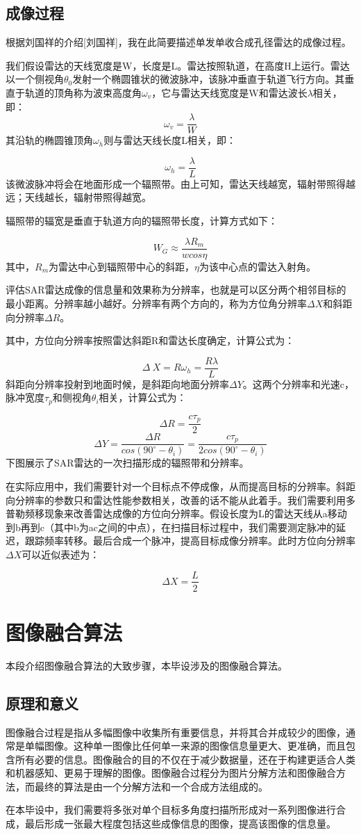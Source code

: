 \documentclass{xduugthesis}
\begin{document}
\subsection{成像过程}
根据刘国祥的介绍[刘国祥]，我在此简要描述单发单收合成孔径雷达的成像过程。\par
我们假设雷达的天线宽度是W，长度是L。雷达按照轨道，在高度H上运行。雷达以一个侧视角$\theta_0$发射一个椭圆锥状的微波脉冲，该脉冲垂直于轨道飞行方向。其垂直于轨道的顶角称为波束高度角$\omega_v$，它与雷达天线宽度是W和雷达波长$\lambda$相关，即：
$$\omega_v=\frac{\lambda}{W}$$
其沿轨的椭圆锥顶角$\omega_h$则与雷达天线长度L相关，即：\par
$$\omega_h=\frac{\lambda}{L}$$
该微波脉冲将会在地面形成一个辐照带。由上可知，雷达天线越宽，辐射带照得越远；天线越长，辐射带照得越宽。\par
辐照带的辐宽是垂直于轨道方向的辐照带长度，计算方式如下：\par
$$W_G\approx\frac{{\lambda}R_m}{wcos\eta}$$
其中，$R_m$为雷达中心到辐照带中心的斜距，$\eta$为该中心点的雷达入射角。\par
评估SAR雷达成像的信息量和效果称为分辨率，也就是可以区分两个相邻目标的最小距离。分辨率越小越好。分辨率有两个方向的，称为方位角分辨率$\Delta X$和斜距向分辨率$\Delta R$。\par
其中，方位向分辨率按照雷达斜距R和雷达长度确定，计算公式为：\par
$$\Delta\ X=R\omega_h=\frac{R\lambda}{L}$$
斜距向分辨率投射到地面时候，是斜距向地面分辨率$\Delta Y$。这两个分辨率和光速c，脉冲宽度$\tau_p$和侧视角$\theta_i$相关，计算公式为：\par
$$\Delta R=\frac{c\tau_p}{2}$$
$$\Delta Y=\frac{\Delta R}{cos(90^\circ-\theta_i)}=\frac{c\tau_p}{2cos(90^\circ-\theta_i)}$$
下图展示了SAR雷达的一次扫描形成的辐照带和分辨率。\par
在实际应用中，我们需要针对一个目标点不停成像，从而提高目标的分辨率。斜距向分辨率的参数只和雷达性能参数相关，改善的话不能从此着手。我们需要利用多普勒频移现象来改善雷达成像的方位向分辨率。假设长度为L的雷达天线从a移动到b再到c（其中b为ac之间的中点），在扫描目标过程中，我们需要测定脉冲的延迟，跟踪频率转移。最后合成一个脉冲，提高目标成像分辨率。此时方位向分辨率$\Delta X$可以近似表述为：\par
$$\Delta X=\frac{L}{2}$$
\section{图像融合算法}
本段介绍图像融合算法的大致步骤，本毕设涉及的图像融合算法。
\subsection{原理和意义}
图像融合过程是指从多幅图像中收集所有重要信息，并将其合并成较少的图像，通常是单幅图像。这种单一图像比任何单一来源的图像信息量更大、更准确，而且包含所有必要的信息。图像融合的目的不仅在于减少数据量，还在于构建更适合人类和机器感知、更易于理解的图像。图像融合过程分为图片分解方法和图像融合方法，而最终的算法是由一个分解方法和一个合成方法组成的。\par
在本毕设中，我们需要将多张对单个目标多角度扫描所形成对一系列图像进行合成，最后形成一张最大程度包括这些成像信息的图像，提高该图像的信息量。
\end{document}
